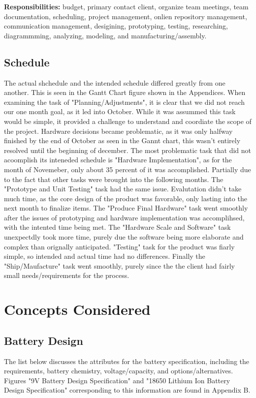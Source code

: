 \documentclass[12pt]{article}
\begin{document}
				\noindent \textbf{Responsibilities:} budget, primary contact client, organize team meetings, team documentation, scheduling, project management, onlien repository management, communication management, desigining, prototyping, testing, researching, diagrammming, analyzing, modeling, and manufacturing/assembly.
		
			\subsection{Schedule}
				The actual shchedule and the intended schedule differed greatly from one another. This is seen in the Gantt Chart figure shown in the Appendices. When examining the task of "Planning/Adjustments", it is clear that we did not reach our one month goal, as it led into October. While it was assummed this task would be simple, it provided a challenge to understand and coordiate the scope of the project. Hardware decisions became problematic, as it was only halfway finished by the end of October as seen in the Gannt chart, this wasn't entirely resolved until the beginning of december. The most problematic task that did not acoomplish its inteneded schedule is "Hardware Implementation", as for the month of Novemeber, only about 35 percent of it was accomplished. Partially due to the fact that other tasks were brought into the following months. The "Prototype and Unit Testing" task had the same issue. Evalutation didn't take much time, as the core design of the product was favorable, only lasting into the next month to finalize items. The "Produce Final Hardware" task went smoothly after the issues of prototyping and hardware implementation was accomplihsed, with the intented time being met. The "Hardware Scale and Software" task unexpectdly took more time, purely due the software being more elaborate and complex than orignally anticipated. "Testing" task for the product was fiarly simple, so intended and actual time had no differences. Finally the "Ship/Maufacture" task went smoothly, purely since the the client had fairly small needs/requirements for the process. 		
				
				\newpage
		
		\section{Concepts Considered}
		
				\subsection{Battery Design}
				The list below discusses the attributes for the battery specification, including the requirements, battery chemistry, voltage/capacity, and options/alternatives. Figures "9V Battery Design Specification" and "18650 Lithium Ion Battery Design Specification" corresponding to this information are found in Appendix B.
				
\end{document}
